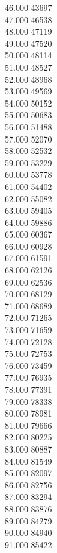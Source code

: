 { 46.000	43697 \\
 47.000	46538 \\
 48.000	47119 \\
 49.000	47520 \\
 50.000	48114 \\
 51.000	48527 \\
 52.000	48968 \\
 53.000	49569 \\
 54.000	50152 \\
 55.000	50683 \\
 56.000	51488 \\
 57.000	52070 \\
 58.000	52532 \\
 59.000	53229 \\
 60.000	53778 \\
 61.000	54402 \\
 62.000	55082 \\
 63.000	59405 \\
 64.000	59886 \\
 65.000	60367 \\
 66.000	60928 \\
 67.000	61591 \\
 68.000	62126 \\
 69.000	62536 \\
 70.000	68129 \\
 71.000	68689 \\
 72.000	71265 \\
 73.000	71659 \\
 74.000	72128 \\
 75.000	72753 \\
 76.000	73459 \\
 77.000	76935 \\
 78.000	77391 \\
 79.000	78338 \\
 80.000	78981 \\
 81.000	79666 \\
 82.000	80225 \\
 83.000	80887 \\
 84.000	81549 \\
 85.000	82097 \\
 86.000	82756 \\
 87.000	83294 \\
 88.000	83876 \\
 89.000	84279 \\
 90.000	84940 \\
 91.000	85422 \\
}
